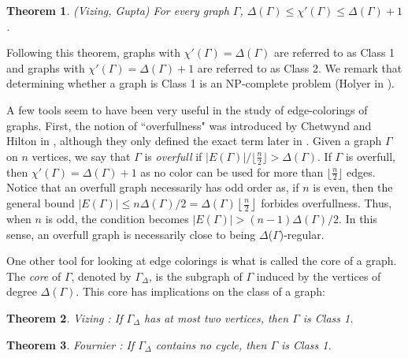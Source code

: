 \documentclass{article}
\newtheorem{theorem}{Theorem}[section]
\theoremstyle{definition}
\theoremstyle{indentclaim}
\theoremstyle{named}
\theoremstyle{named}
\begin{document}
\begin{theorem}(Vizing, Gupta)
    For every graph $\Gamma$, $\Delta(\Gamma) \leq \chi'(\Gamma) \leq \Delta(\Gamma)+1$. 
\end{theorem}

Following this theorem, graphs with $\chi'(\Gamma) = \Delta(\Gamma)$ are referred to as Class 1 and graphs with $\chi'(\Gamma) = \Delta(\Gamma)+1$ are referred to as Class 2. We remark that determining whether a graph is Class 1 is an NP-complete problem (Holyer in \cite{NP}). 

\medskip

A few tools seem to have been very useful in the study of edge-colorings of graphs. First, the notion of ``overfullness" was introduced by Chetwynd and Hilton in \cite{C-H-initial}, although they only defined the exact term later in \cite{C-H-conjecture}. Given a graph $\Gamma$ on $n$ vertices, we say that $\Gamma$ is \textit{overfull} if $|E(\Gamma)| / \lfloor\frac{n}{2}\rfloor > \Delta(\Gamma)$. If $\Gamma$ is overfull, then $\chi'(\Gamma) = \Delta(\Gamma)+1$ as no color can be used for more than $\lfloor\frac{n}{2}\rfloor$ edges. 
Notice that an overfull graph necessarily has odd order as, if $n$ is even, then the general bound
$|E(\Gamma)|\leq n\Delta(\Gamma)/2
=\Delta(\Gamma)\left\lfloor\frac n2\right\rfloor$
forbides overfullness. Thus, when $n$ is odd, the condition becomes $|E(\Gamma)|>(n-1)\Delta(\Gamma)/2$.
In this sense, an overfull graph is necessarily close to being $\Delta$($\Gamma$)-regular. 

One other tool for looking at edge colorings is what is called the core of a graph. The \textit{core} of $\Gamma$, denoted by $\Gamma_\Delta$, is the subgraph of $\Gamma$ induced by the vertices of degree $\Delta(\Gamma)$. This core has implications on the class of a graph: 


\begin{theorem}Vizing \cite{Vizing-core}\label{Vizing}:
    If $\Gamma_\Delta$ has at most two vertices, then $\Gamma$ is Class 1. 
\end{theorem}

\begin{theorem}Fournier \cite{Fournier}\label{fournier}:
    If $\Gamma_\Delta$ contains no cycle, then $\Gamma$ is Class 1. 
\end{theorem}

\end{document}
